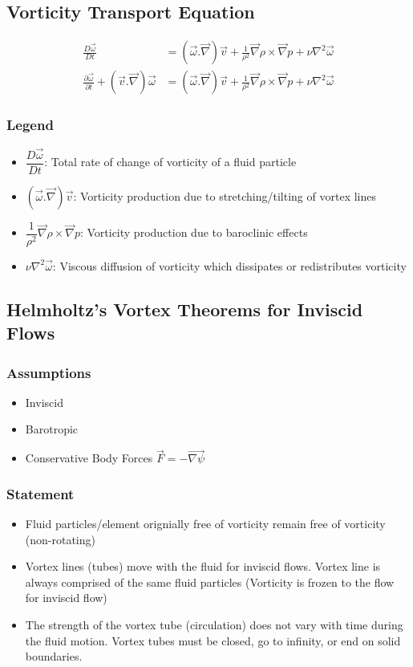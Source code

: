 \documentclass[11pt, letterpaper, notitlepage]{article}
\begin{document}
\subsection{Vorticity Transport Equation}
\begin{align*}
\frac{D\vec{\omega}}{Dt} &= (\vec{\omega}.\vec{\nabla}) \vec{v} + \frac{1}{\rho^2} \vec{\nabla} \rho \times \vec{\nabla} p + \nu \nabla^2 \vec{\omega} \\
\frac{\partial \vec{\omega}}{\partial t} + (\vec{v}.\vec{\nabla})\vec{\omega} &= (\vec{\omega}.\vec{\nabla}) \vec{v} + \frac{1}{\rho^2} \vec{\nabla} \rho \times \vec{\nabla} p + \nu \nabla^2 \vec{\omega}
\end{align*}

\subsubsection{Legend}
\begin{itemize}
\item $\dfrac{D\vec{\omega}}{Dt}$: Total rate of change of vorticity of a fluid particle
\item $(\vec{\omega}.\vec{\nabla}) \vec{v}$: Vorticity production due to stretching/tilting of vortex lines
\item $\dfrac{1}{\rho^2} \vec{\nabla} \rho \times \vec{\nabla} p$: Vorticity production due to baroclinic effects
\item $\nu \nabla^2 \vec{\omega}$: Viscous diffusion of vorticity which dissipates or redistributes vorticity
\end{itemize}

\subsection{Helmholtz's Vortex Theorems for Inviscid Flows}
\subsubsection{Assumptions}
\begin{itemize}
\item Inviscid
\item Barotropic
\item Conservative Body Forces $\vec{F} = -\vec{\nabla{\psi}}$
\end{itemize}

\subsubsection{Statement}
\begin{itemize}
\item Fluid particles/element orignially free of vorticity remain free of vorticity (non-rotating)
\item Vortex lines (tubes) move with the fluid for inviscid flows. Vortex line is always comprised of the same fluid particles (Vorticity is frozen to the flow for inviscid flow)
\item The strength of the vortex tube (circulation) does not vary with time during the fluid motion. Vortex tubes must be closed, go to infinity, or end on solid boundaries.
\end{itemize}
\end{document}
